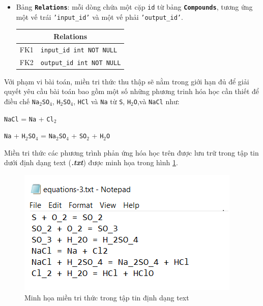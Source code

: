 \documentclass[a4paper]{article}
\begin{document}
\begin{itemize}
		\item Bảng \textbf{\texttt{Relations}}: mỗi dòng chứa một cặp \texttt{id} từ bảng \textbf{\texttt{Compounds}}, tương ứng một vế trái \texttt{'input\_id'} và một vế phải \texttt{'output\_id'}.
		
		\begin{tabular}{|c|l|}
			\hline
			\multicolumn{2}{|c|}{\textbf{Relations}} \\
			\hline
			FK1 & \texttt{input\_id int NOT NULL} \\
			\hline
			FK2 & \texttt{output\_id int NOT NULL} \\
			\hline
		\end{tabular}
	\end{itemize}

	Với phạm vi bài toán, miền tri thức thu thập sẽ nằm trong giới hạn đủ để giải quyết yêu cầu bài toán bao gồm một số những phương trinh hóa học cần thiết để điều chế \texttt{Na$_2$SO$_4$}, \texttt{H$_2$SO$_4$}, \texttt{HCl} và \texttt{Na} từ \texttt{S}, \texttt{H$_2$O},và \texttt{NaCl} như:
	
	\texttt{NaCl} = \texttt{Na} + \texttt{Cl$_2$}  
	
	\texttt{Na} + \texttt{H$_2$SO$_4$} = \texttt{Na$_2$SO$_4$} + \texttt{SO$_2$} + \texttt{H$_2$O}
	
	Miền tri thức các phương trình phản ứng hóa học trên được lưu trữ trong tập tin dưới định dạng text (\textbf{\textit{.txt}}) được minh họa trong hình \ref{fig-2a:mien-tri-thuc}. 
	\begin{figure}[h]
		\centering
		\includegraphics[width=0.7\linewidth]{images/2a_mien-tri-thuc}
		\caption{Minh họa miền tri thức trong tập tin định dạng text}
		\label{fig-2a:mien-tri-thuc}
	\end{figure}
	
\end{document}
